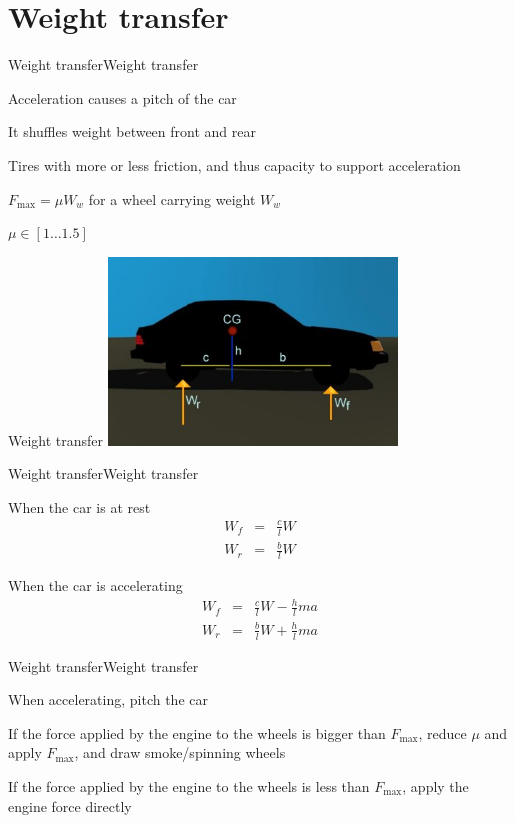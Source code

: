 \documentclass{beamer}
\begin{document}
\section{Weight transfer}
\begin{slide}{Weight transfer}{Weight transfer}{
\item Acceleration causes a pitch of the car
\item It shuffles weight between front and rear
\item Tires with more or less friction, and thus capacity to support acceleration
\item $F_{\text{max}} = \mu W_w$ for a wheel carrying weight $W_w$
\item $\mu \in [1 \dots 1.5]$
}\end{slide}

\begin{frame}{Weight transfer}
\center
\includegraphics[height=5cm]{Pics/WeightTransfer.png}
\end{frame}

\begin{slide}{Weight transfer}{Weight transfer}{
\item When the car is at rest
\begin{eqnarray}
W_f &=& \frac{c}{l}W \\
W_r &=& \frac{b}{l}W
\end{eqnarray}
\item When the car is accelerating
\begin{eqnarray}
W_f &=& \frac{c}{l}W - \frac{h}{l}ma \\
W_r &=& \frac{b}{l}W + \frac{h}{l}ma
\end{eqnarray}
}\end{slide}

\begin{slide}{Weight transfer}{Weight transfer}{
\item When accelerating, pitch the car
\item If the force applied by the engine to the wheels is bigger than $F_{\text{max}}$, reduce $\mu$ and apply $F_{\text{max}}$, and draw smoke/spinning wheels
\item If the force applied by the engine to the wheels is less than $F_{\text{max}}$, apply the engine force directly
}\end{slide}
\end{document}
